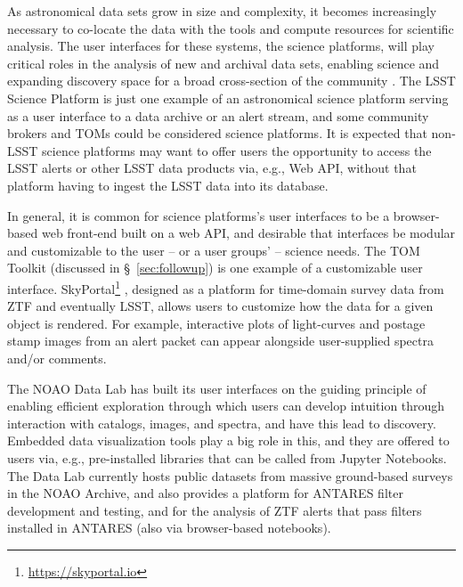 As astronomical data sets grow in size and complexity, it becomes increasingly necessary to co-locate the data with the tools and compute resources for scientific analysis.
The user interfaces for these systems, the science platforms, will play critical roles in the analysis of new and archival data sets, enabling science and expanding discovery space for a broad cross-section of the community \citep[e.g.,][]{2019arXiv190305130O}.
The   LSST  {Science Platform} is just one example of an astronomical science platform serving as a user interface to a data archive or an alert stream, and some community brokers and TOMs could be considered science platforms.
It is expected that non-LSST science platforms may want to offer users the opportunity to access the   LSST alerts or other   LSST data products via, e.g., Web  {API}, without that platform having to ingest the   LSST data into its database.

In general, it is common for science platforms's user interfaces to be a browser-based web front-end built on a web  {API}, and desirable that interfaces be modular and customizable to the user -- or a user groups' -- science needs.
The  {TOM} Toolkit (discussed in \S~\ref{sec:followup}) is one example of a customizable user interface.
SkyPortal\footnote{\url{https://skyportal.io}} \citep{skyportal2019}, designed as a platform for time-domain survey data from  {ZTF} and eventually  {LSST}, allows users to customize how the data for a given object is rendered.
For example, interactive plots of light-curves and  {postage stamp} images from an alert packet can appear alongside user-supplied spectra and/or comments.

The  {NOAO} Data Lab \citep{2019arXiv190800664O} has built its user interfaces on the guiding principle of enabling efficient exploration through which users can develop intuition through interaction with catalogs, images, and spectra, and have this lead to discovery.
Embedded data visualization tools play a big role in this, and they are offered to users via, e.g., pre-installed libraries that can be called from Jupyter Notebooks.
The Data Lab currently hosts public datasets from massive ground-based surveys in the  {NOAO}  {Archive}, and also provides a platform for  {ANTARES} filter development and testing, and for the analysis of  {ZTF} alerts that pass filters installed in  {ANTARES} (also via browser-based notebooks). 

